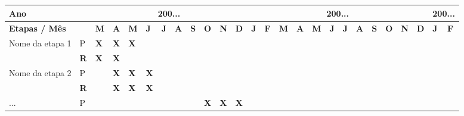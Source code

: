 \begin{table}[htbp]
	\begin{tabular}{|p{3cm}|p{0.07cm}|p{0.07cm}|p{0.07cm}|p{0.07cm}|p{0.07cm}|p{0.07cm}|p{0.07cm}|p{0.07cm}|p{0.07cm}|p{0.07cm}|p{0.07cm}|p{0.07cm}|p{0.07cm}|p{0.07cm}|p{0.07cm}|p{0.07cm}|p{0.07cm}|p{0.07cm}|p{0.07cm}|p{0.07cm}|p{0.07cm}|p{0.07cm}|p{0.07cm}|p{0.07cm}|p{0.07cm}|}
		\hline
		\multicolumn{ 2}{|l|}{\textbf{Ano}} & \multicolumn{ 10}{c|}{\textbf{200...}} & \multicolumn{ 12}{c|}{\textbf{200...}} & \multicolumn{ 2}{c|}{\textbf{200...}} \\ \hline
		\multicolumn{ 2}{|l|}{\textbf{Etapas / Mês}} & \textbf{M} & \textbf{A} & \textbf{M} & \textbf{J} & \textbf{J} & \textbf{A} & \textbf{S} & \textbf{O} & \textbf{N} & \textbf{D} & \textbf{J} & \textbf{F} & \textbf{M} & \textbf{A} & \textbf{M} & \textbf{J} & \textbf{J} & \textbf{A} & \textbf{S} & \textbf{O} & \textbf{N} & \textbf{D} & \textbf{J} & \textbf{F} \\ \hline
		Nome da etapa 1 & P & \textbf{X} & \textbf{X} & \textbf{X} & \textbf{} & \textbf{} & \textbf{} & \textbf{} & \textbf{} & \textbf{} & \textbf{} & \textbf{} & \textbf{} & \textbf{} & \textbf{} & \textbf{} & \textbf{} & \textbf{} & \textbf{} & \textbf{} & \textbf{} & \textbf{} & \textbf{} & \textbf{} & \textbf{} \\ \hline
		\textbf{} & \textbf{R} & \textbf{X} & \textbf{X} & \textbf{} & \textbf{} & \textbf{} & \textbf{} & \textbf{} & \textbf{} & \textbf{} & \textbf{} & \textbf{} & \textbf{} & \textbf{} & \textbf{} & \textbf{} & \textbf{} & \textbf{} & \textbf{} & \textbf{} & \textbf{} & \textbf{} & \textbf{} & \textbf{} & \textbf{} \\ \hline
		Nome da etapa 2 & P & \textbf{} & \textbf{X} & \textbf{X} & \textbf{X} & \textbf{} & \textbf{} & \textbf{} & \textbf{} & \textbf{} & \textbf{} & \textbf{} & \textbf{} & \textbf{} & \textbf{} & \textbf{} & \textbf{} & \textbf{} & \textbf{} & \textbf{} & \textbf{} & \textbf{} & \textbf{} & \textbf{} & \textbf{} \\ \hline
		\textbf{} & \textbf{R} & \textbf{} & \textbf{X} & \textbf{X} & \textbf{X} & \textbf{} & \textbf{} & \textbf{} & \textbf{} & \textbf{} & \textbf{} & \textbf{} & \textbf{} & \textbf{} & \textbf{} & \textbf{} & \textbf{} & \textbf{} & \textbf{} & \textbf{} & \textbf{} & \textbf{} & \textbf{} & \textbf{} & \textbf{} \\ \hline
		... & P & \textbf{} & \textbf{} & \textbf{} & \textbf{} & \textbf{} & \textbf{} & \textbf{} & \textbf{X} & \textbf{X} & \textbf{X} & \textbf{} & \textbf{} & \textbf{} & \textbf{} & \textbf{} & \textbf{} & \textbf{} & \textbf{} & \textbf{} & \textbf{} & \textbf{} & \textbf{} & \textbf{} & \textbf{} \\ \hline

\end{tabular}
\end{table}
